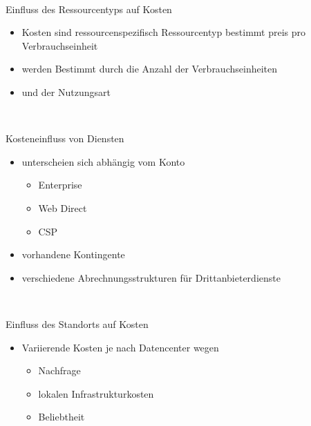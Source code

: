\documentclass{scrartcl}
\newenvironment{flashcard}[2][]{%
    #1
    \vfill
    \centerline{\Large{#2}}
    \vfill
\newpage
}
{\newpage}
\begin{document}
    \begin{flashcard}[\ ]{Einfluss des Ressourcentyps auf Kosten}
        \begin{itemize}
            \item Kosten sind ressourcenspezifisch\newline
            Ressourcentyp bestimmt preis pro Verbrauchseinheit
            \item werden Bestimmt durch die Anzahl der Verbrauchseinheiten
            \item und der Nutzungsart
        \end{itemize}

    \end{flashcard}

    \begin{flashcard}[\ ]{Kosteneinfluss von Diensten}
        \begin{itemize}
            \item unterscheien sich abhängig vom Konto
            \begin{itemize}
                \item Enterprise
                \item Web Direct
                \item CSP
            \end{itemize}
            \item vorhandene Kontingente
            \item verschiedene Abrechnungsstrukturen für Drittanbieterdienste
        \end{itemize}
    \end{flashcard}

    \begin{flashcard}[\ ]{Einfluss des Standorts auf Kosten}
        \begin{itemize}
            \item Variierende Kosten je nach Datencenter wegen
            \begin{itemize}
                \item Nachfrage
                \item lokalen Infrastrukturkosten
                \item Beliebtheit
            \end{itemize}
        \end{itemize}

    \end{flashcard}
\end{document}
